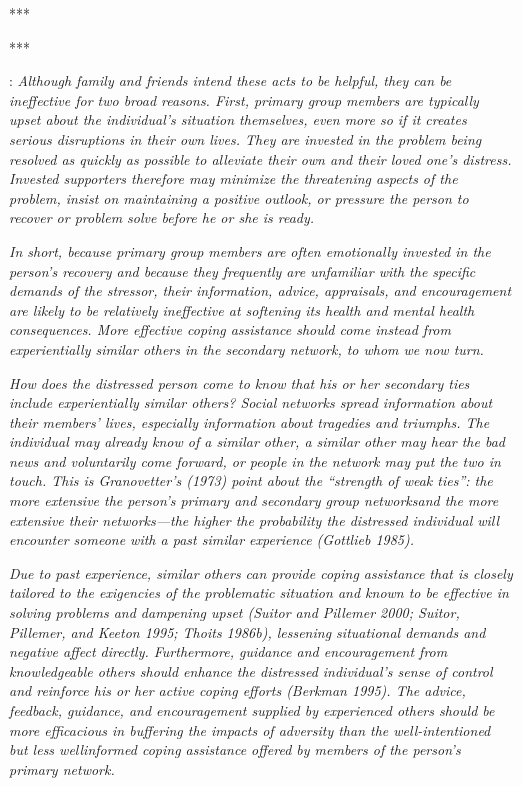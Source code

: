 \documentclass[]{article}
\begin{document}
***

***

\cite{thoits2011mechanisms}:
\textit{Although family and friends intend these acts to be helpful, they can be ineffective for two broad reasons. First, primary group members are typically upset about the individual’s situation themselves, even more so if it creates serious disruptions in their own lives. They are invested in the problem being resolved as quickly as possible to alleviate their own and their loved one’s distress. Invested supporters therefore may minimize the threatening aspects of the problem, insist on maintaining a positive outlook, or pressure the person to recover or problem solve before he or she is ready.}

\textit{In short, because primary group members are often emotionally invested in the person’s recovery and because they frequently are unfamiliar with the specific demands of the stressor, their information, advice, appraisals, and encouragement are likely to be relatively ineffective at softening its health and mental health consequences. More effective coping assistance should come instead from experientially similar others in the secondary network, to whom we now turn.}

\textit{How does the distressed person come to know that his or her secondary ties include experientially similar others? Social networks spread information about their members’ lives, especially information about tragedies and triumphs. The individual may already know of a similar other, a similar other may hear the bad news and voluntarily come forward, or people in the network may put the two in touch. This is Granovetter’s (1973) point about the “strength of weak ties”: the more extensive the person’s primary and secondary group networksand the more extensive their networks—the higher the probability the distressed individual will encounter someone with a past similar experience (Gottlieb 1985).}

\textit{Due to past experience, similar others can provide coping assistance that is closely tailored to the exigencies of the problematic situation and known to be effective in solving problems and dampening upset (Suitor and Pillemer 2000; Suitor, Pillemer, and Keeton 1995; Thoits 1986b), lessening situational demands and negative affect directly. Furthermore, guidance and encouragement from knowledgeable others should enhance the distressed individual’s sense of control and reinforce his or her active coping efforts (Berkman 1995). The advice, feedback, guidance, and encouragement supplied by experienced others should be more efficacious in buffering the impacts of adversity than the well-intentioned but less wellinformed coping assistance offered by members of the person’s primary network.}
\end{document}
